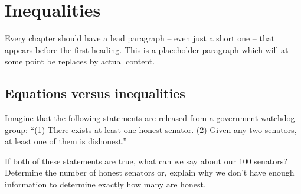 \chapter{Inequalities}
\label{ch:inequalities}

\newcommand{\gridconfig}[4]
{
	\draw[very thin, step=1.0, color=gray!25] (#1,#3) grid (#2,#4);
	\draw[<->,thick] (#1-0.5,0) -- (#2+0.5,0);%
	\draw[<->,thick] (0,#3-0.5) -- (0,#4+0.5);%
	\foreach \x in {-2,-4,...,#1} \draw (\x,0.05) -- (\x,-0.05)
		node[below] {\footnotesize\x};
	\foreach \x in {2,4,...,#2} \draw (\x,0.05) -- (\x,-0.05)
		node[below] {\footnotesize\x};
	\foreach \y in {-2,-4,...,#3} \draw (-0.05,\y) -- (0.05,\y)
		node[left] {\footnotesize\y};
	\foreach \y in {2,4,...,#4} \draw (-0.05,\y) -- (0.05,\y)
		node[left] {\footnotesize\y};
	\draw(0,0) node[below left] {\footnotesize0};
%	
}



Every chapter should have a lead paragraph -- even just a short one -- that appears before the first heading. This is a placeholder paragraph which will at some point be replaces by actual content.

\section{Equations versus inequalities}
\label{sec:ineqintro}

\begin{boxedexplore}
Imagine that the following statements are released from a government watchdog group: ``(1) There exists at least one honest senator. (2) Given any two senators, at least one of them is dishonest.''

If both of these statements are true, what can we say about our 100 senators? Determine the number of honest senators or, explain why we don't have enough information to determine exactly how many are honest.
\end{boxedexplore}

